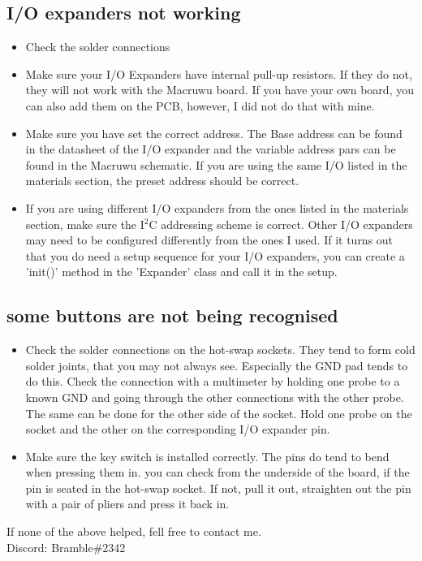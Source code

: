 \documentclass[english, 12pt]{scrartcl}
\begin{document}
	\subsection{I/O expanders not working}
	\begin{itemize}
		\item Check the solder connections
		\item Make sure your I/O Expanders have internal pull-up resistors. If they do not, they will not work with the Macruwu board. If you have your own board, you can also add them on the PCB, however, I did not do that with mine.
		\item Make sure you have set the correct address. The Base address can be found in the datasheet of the I/O expander and the variable address pars can be found in the Macruwu schematic. If you are using the same I/O listed in the materials section, the preset address should be correct.
		\item If you are using different I/O expanders from the ones listed in the materials section, make sure the I$^2$C addressing scheme is correct. Other I/O expanders may need to be configured differently from the ones I used. If it turns out that you do need a setup sequence for your I/O expanders, you can create a 'init()' method in the 'Expander' class and call it in the setup.
	\end{itemize}
	\subsection{some buttons are not being recognised}
	\begin{itemize}
		\item Check the solder connections on the hot-swap sockets. They tend to form cold solder joints, that you may not always see. Especially the GND pad tends to do this. Check the connection with a multimeter by holding one probe to a known GND and going through the other connections with the other probe. The same can be done for the other side of the socket. Hold one probe on the socket and the other on the corresponding I/O expander pin.
		\item Make sure the key switch is installed correctly. The pins do tend to bend when pressing them in. you can check from the underside of the board, if the pin is seated in the hot-swap socket. If not, pull it out, straighten out the pin with a pair of pliers and press it back in.
	\end{itemize}
	If none of the above helped, fell free to contact me.\\
	Discord: Bramble\#2342
\end{document}

